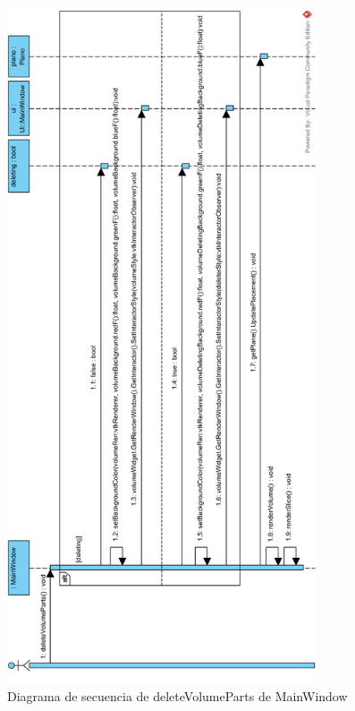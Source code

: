 \begin{figure}[H]
	\centering
	\includegraphics[height=20cm]{imagenes/diagramas/secuencia/MainWindow_DeleteVolumeParts}
	\caption{Diagrama de secuencia de deleteVolumeParts de MainWindow}
	\label{fig:diagrama_secuencia_mainWindow_deleteVolumeParts}
\end{figure}

